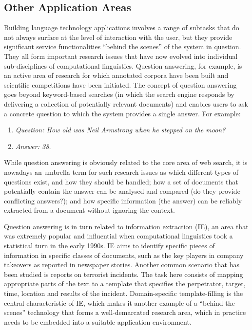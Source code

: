 \begin{multicols}{2}
\subsection{Other Application Areas}

Building language technology applications involves a range of subtasks that do not always surface at the level of interaction with the user, but they provide significant service functionalities “behind the scenes” of the system in question. They all form important research issues that have now evolved into individual sub-disciplines of computational linguistics.  Question answering, for example, is an active area of research for which annotated corpora have been built and scientific competitions have been initiated. The concept of question answering goes beyond keyword-based searches (in which the search engine responds by delivering a collection of potentially relevant documents) and enables users to ask a concrete question to which the system provides a single answer. For example:
\begin{enumerate}
\item[]\textit{Question: How old was Neil Armstrong when he stepped on the moon?}
\item[]\textit{Answer: 38.}
\end{enumerate}
While question answering is obviously related to the core area of web search, it is nowadays an umbrella term for such research issues as which different types of questions exist, and how they should be handled; how a set of documents that potentially contain the answer can be analysed and compared (do they provide conflicting answers?); and how specific information (the answer) can be reliably extracted from a document without ignoring the context. 


Question answering is in turn related to information extraction (IE), an area that was extremely popular and influential when computational linguistics took a statistical turn in the early 1990s. IE aims to identify specific pieces of information in specific classes of documents, such as the key players in company takeovers as reported in newspaper stories. Another common scenario that has been studied is reports on terrorist incidents. The task here consists of mapping appropriate parts of the text to a template that specifies the perpetrator, target, time, location and results of the incident. Domain-specific template-filling is the central characteristic of IE, which makes it another example of a “behind the scenes” technology that forms a well-demarcated research area, which in practice needs to be embedded into a suitable application environment. 


\end{multicols}

